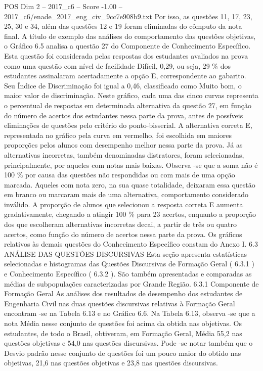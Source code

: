 \begin{textsample}{POS Dim 2 – 2017\_c6 – Score -1.00 – 2017\_c6/enade\_2017\_eng\_civ\_9cc7e908b9.txt}
Por isso, as questões 11, 17, 23, 25, 30 e 34, além das questões 12 e 19 foram eliminadas do cômputo da nota final.
A título de exemplo das análises do comportamento das questões objetivas, o Gráfico 6.5 analisa a questão 27 do Componente de Conhecimento Específico.
Esta questão foi considerada pelas respostas dos estudantes avaliados na prova como uma questão com nível de facilidade Difícil, 0,29, ou seja, 29 \% dos estudantes assinalaram acertadamente a opção E, correspondente ao gabarito.
Seu Índice de Discriminação foi igual a 0,46, classificado como Muito bom, o maior valor de discriminação.
Neste gráfico, cada uma das cinco curvas representa o percentual de respostas em determinada alternativa da questão 27, em função do número de acertos dos estudantes nessa parte da prova, antes de possíveis eliminações de questões pelo critério do ponto-bisserial.
A alternativa correta E, representada no gráfico pela curva em vermelho, foi escolhida em maiores proporções pelos alunos com desempenho melhor nessa parte da prova.
Já as alternativas incorretas, também denominadas distratores, foram selecionadas, principalmente, por aqueles com notas mais baixas.
Observa -se que a soma não é 100 \% por causa das questões não respondidas ou com mais de uma opção marcada.
Aqueles com nota zero, na sua quase totalidade, deixaram essa questão em branco ou marcaram mais de uma alternativa, comportamento considerado inválido.
A proporção de alunos que selecionou a resposta correta E aumenta gradativamente, chegando a atingir 100 \% para 23 acertos, enquanto a proporção dos que escolheram alternativas incorretas decai, a partir de três ou quatro acertos, como função do número de acertos nessa parte da prova.
Os gráficos relativos às demais questões do Conhecimento Específico constam do Anexo I. 6.3 ANÁLISE DAS QUESTÕES DISCURSIVAS Esta seção apresenta estatísticas selecionadas e histogramas das Questões Discursivas de Formação Geral ( 6.3.1 ) e Conhecimento Específico ( 6.3.2 ).
São também apresentadas e comparadas as médias de subpopulações caracterizadas por Grande Região. 6.3.1 Componente de Formação Geral As análises dos resultados de desempenho dos estudantes de Engenharia Civil nas duas questões discursivas relativas à Formação Geral encontram -se na Tabela 6.13 e no Gráfico 6.6.
Na Tabela 6.13, observa -se que a nota Média nesse conjunto de questões foi acima da obtida nas objetivas.
Os estudantes, de todo o Brasil, obtiveram, em Formação Geral, Média 55,2 nas questões objetivas e 54,0 nas questões discursivas.
Pode -se notar também que o Desvio padrão nesse conjunto de questões foi um pouco maior do obtido nas objetivas, 21,6 nas questões objetivas e 23,8 nas questões discursivas.

\end{textsample}

